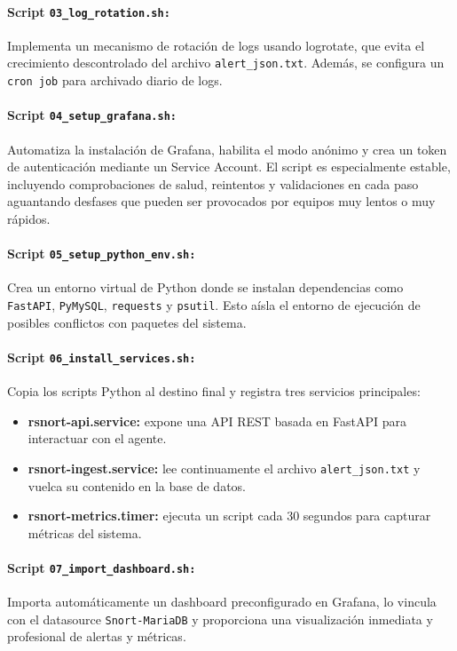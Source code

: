 \documentclass[11pt,a4paper,twoside]{report}
\begin{document}
\paragraph{Script \texttt{03\_log\_rotation.sh:}} Implementa un mecanismo de rotación de logs usando logrotate, que evita el crecimiento descontrolado del archivo \texttt{alert\_json.txt}. Además, se configura un \texttt{cron job} para archivado diario de logs.

\paragraph{Script \texttt{04\_setup\_grafana.sh:}} Automatiza la instalación de Grafana, habilita el modo anónimo y crea un token de autenticación mediante un Service Account. El script es especialmente estable, incluyendo comprobaciones de salud, reintentos y validaciones en cada paso aguantando desfases que pueden ser provocados por equipos muy lentos o muy rápidos.

\paragraph{Script \texttt{05\_setup\_python\_env.sh:}} Crea un entorno virtual de Python donde se instalan dependencias como \texttt{FastAPI}, \texttt{PyMySQL}, \texttt{requests} y \texttt{psutil}. Esto aísla el entorno de ejecución de posibles conflictos con paquetes del sistema.

\paragraph{Script \texttt{06\_install\_services.sh:}} Copia los scripts Python al destino final y registra tres servicios principales:

\begin{itemize}
	\item \textbf{rsnort-api.service:} expone una API REST basada en FastAPI para interactuar con el agente.
	\item \textbf{rsnort-ingest.service:} lee continuamente el archivo \texttt{alert\_json.txt} y vuelca su contenido en la base de datos.
	\item \textbf{rsnort-metrics.timer:} ejecuta un script cada 30 segundos para capturar métricas del sistema.
\end{itemize}

\paragraph{Script \texttt{07\_import\_dashboard.sh:}} Importa automáticamente un dashboard preconfigurado en Grafana, lo vincula con el datasource \texttt{Snort-MariaDB} y proporciona una visualización inmediata y profesional de alertas y métricas.
\end{document}

